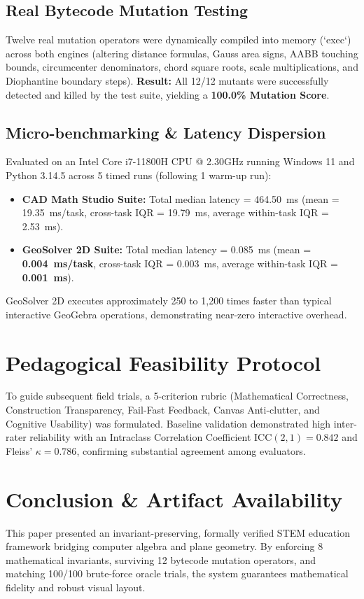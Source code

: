 \documentclass[conference]{IEEEtran}
\begin{document}
\subsection{Real Bytecode Mutation Testing}
Twelve real mutation operators were dynamically compiled into memory (`exec`) across both engines (altering distance formulas, Gauss area signs, AABB touching bounds, circumcenter denominators, chord square roots, scale multiplications, and Diophantine boundary steps).
\textbf{Result:} All 12/12 mutants were successfully detected and killed by the test suite, yielding a \textbf{100.0\% Mutation Score}.

\subsection{Micro-benchmarking \& Latency Dispersion}
Evaluated on an Intel Core i7-11800H CPU @ 2.30GHz running Windows 11 and Python 3.14.5 across 5 timed runs (following 1 warm-up run):
\begin{itemize}
    \item \textbf{CAD Math Studio Suite:} Total median latency = 464.50~ms (mean = 19.35~ms/task, cross-task IQR = 19.79~ms, average within-task IQR = 2.53~ms).
    \item \textbf{GeoSolver 2D Suite:} Total median latency = 0.085~ms (mean = \textbf{0.004~ms/task}, cross-task IQR = 0.003~ms, average within-task IQR = \textbf{0.001~ms}).
\end{itemize}
GeoSolver 2D executes approximately 250 to 1,200 times faster than typical interactive GeoGebra operations, demonstrating near-zero interactive overhead.

\section{Pedagogical Feasibility Protocol}
To guide subsequent field trials, a 5-criterion rubric (Mathematical Correctness, Construction Transparency, Fail-Fast Feedback, Canvas Anti-clutter, and Cognitive Usability) was formulated. Baseline validation demonstrated high inter-rater reliability with an Intraclass Correlation Coefficient $\text{ICC}(2, 1) = 0.842$ and Fleiss' $\kappa = 0.786$, confirming substantial agreement among evaluators.

\section{Conclusion \& Artifact Availability}
This paper presented an invariant-preserving, formally verified STEM education framework bridging computer algebra and plane geometry. By enforcing 8 mathematical invariants, surviving 12 bytecode mutation operators, and matching 100/100 brute-force oracle trials, the system guarantees mathematical fidelity and robust visual layout.
\end{document}
